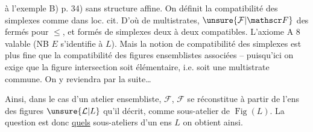  à l'exemple B) p. 34) sans structure affine. On définit la compatibilité des simplexes comme dans loc. cit. 
D'où  de multistrates,  $\unsure{\mathcal F|\mathscr F}$  des  fermés pour $\leq$, et formés de simplexes deux à deux compatibles. L'axiome A 8  valable (NB $E$ s'identifie à $L$). Mais la notion de compatibilité des simplexes est plus fine que la compatibilité des figures ensemblistes associées -- puisqu'ici on exige  que la figure intersection soit élémentaire, i.e. soit une multistrate commune. On y reviendra par la suite\ldots

Ainsi, dans le cas d'un atelier ensembliste, $\mathcal F$, $\mathcal F$ se réconstitue à partir de  l'ens des figures  $\unsure{\mathcal L|L}$ qu'il décrit, comme sous-atelier de $\operatorname{Fig}(L)$. La question est donc \uline{quels} sous-ateliers d'un ens $L$ on obtient ainsi.
